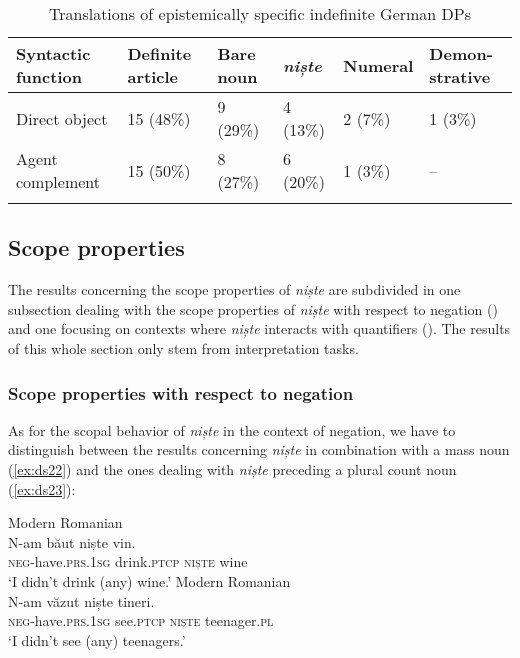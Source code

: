 \documentclass[output=paper,colorlinks,citecolor=brown]{langscibook}
\begin{document}
\begin{table}
\small
\begin{tabularx}{\textwidth}{lXXXXX}
\lsptoprule
Syntactic function & Definite article & Bare noun & \textit{niște} & Numeral & Demon-strative\\
\midrule
Direct object    & 15 (48\%) & 9 (29\%) & 4 (13\%) & 2 (7\%) & 1 (3\%)\\
Agent complement & 15 (50\%) & 8 (27\%) & 6 (20\%) & 1 (3\%) &  --\\
\lspbottomrule
\end{tabularx}
\caption{Translations of epistemically specific indefinite German DPs}
\label{tab:ds4}
\end{table}

\subsection{Scope properties}\label{sec:ds4.4}
The results concerning the scope properties of \textit{niște} are subdivided in one subsection dealing with the scope properties of \textit{niște} with respect to negation () and one focusing on contexts where \textit{niște} interacts with quantifiers (). The results of this whole section only stem from interpretation tasks.

\subsubsection{Scope properties with respect to negation}\label{sec:ds4.4.1}

As for the scopal behavior of \textit{niște} in the context of negation, we have to distinguish between the results concerning \textit{niște} in combination with a mass noun (\ref{ex:ds22}) and the ones dealing with \textit{niște} preceding a plural count noun (\ref{ex:ds23}):

\ea\label{ex:ds22} Modern Romanian\\
\gll N-am b\u{a}ut niște vin.\\
     \textsc{neg}{}-have\textsc{.prs.}1\textsc{sg} drink.\textsc{ptcp} \textsc{niște} wine\\
\glt ‘I didn’t drink (any) wine.’
\pagebreak
\ex \label{ex:ds23} Modern Romanian\\
\gll   N-am v\u{a}zut niște tineri.\\
     \textsc{neg{}-}have.\textsc{prs}.1\textsc{sg} see.\textsc{ptcp} \textsc{niște} teenager.\textsc{pl}\\
\glt ‘I didn’t see (any) teenagers.’
\z
\end{document}
